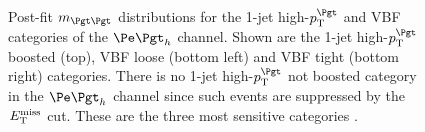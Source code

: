 \begin{figure}[tbh]

\caption[Post-fit $m_{\Pgt\Pgt}$ distributions for the 1-jet high-$\pt^{\Pgt}$ and VBF 
categories of the $\etau$ channel.]{Post-fit $m_{\Pgt\Pgt}$ distributions for
the 1-jet high-$\pt^{\Pgt}$ and VBF categories of the $\etau$ channel. Shown
are the 1-jet high-$\pt^{\Pgt}$ boosted (top), VBF loose (bottom left) and VBF tight (bottom right) categories. There
is no 1-jet high-$\pt^{\Pgt}$ not boosted category in the $\etau$ channel since
such events are suppressed by the $E_{\mathrm{T}}^{\text{miss}}$ cut. These
are the three most sensitive categories \cite{HIG-13-004}.}
\label{fig:postfit1jetvbfetau}
\end{figure}

